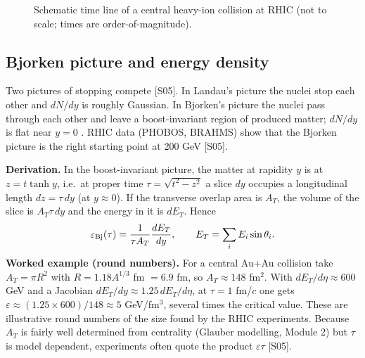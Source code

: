 \documentclass[11pt,letterpaper]{article}
\begin{document}
\begin{figure}[h]\centering
{}
\caption{Schematic time line of a central heavy-ion collision at RHIC (not to scale; times are order-of-magnitude).}
\label{fig:timeline}\end{figure}

\subsection{Bjorken picture and energy density}
Two pictures of stopping compete [S05]. In Landau's picture the nuclei stop each other and $dN/dy$ is roughly
Gaussian. In Bjorken's picture the nuclei pass through each other and leave a boost-invariant region of produced
matter; $dN/dy$ is flat near $y=0$ \cite{bjorken}. RHIC data (PHOBOS, BRAHMS) show that the Bjorken picture is the
right starting point at 200 GeV [S05].

\textbf{Derivation.} In the boost-invariant picture, the matter at rapidity $y$ is at $z=t\tanh y$, i.e.\ at proper
time $\tau=\sqrt{t^2-z^2}$ a slice $dy$ occupies a longitudinal length $dz=\tau\,dy$ (at $y\approx0$). If the
transverse overlap area is $A_T$, the volume of the slice is $A_T\tau\,dy$ and the energy in it is $dE_T$. Hence
\begin{equation}
\varepsilon_{\rm Bj}(\tau)=\frac{1}{\tau A_T}\frac{dE_T}{dy},\qquad E_T=\sum_i E_i\sin\theta_i .
\label{eq:bj}
\end{equation}
\textbf{Worked example (round numbers).} For a central Au+Au collision take $A_T=\pi R^2$ with $R=1.18A^{1/3}$ fm
$=6.9$ fm, so $A_T\approx148$ fm$^2$. With $dE_T/d\eta\approx600$ GeV and a Jacobian $dE_T/dy\approx1.25\,dE_T/d\eta$,
at $\tau=1$ fm/$c$ one gets $\varepsilon\approx(1.25\times600)/148\approx5$ GeV/fm$^3$, several times the critical
value. These are illustrative round numbers of the size found by the RHIC experiments. Because $A_T$ is fairly
well determined from centrality (Glauber modelling, Module 2) but $\tau$ is model dependent, experiments often quote
the product $\varepsilon\tau$ [S05].
\end{document}
